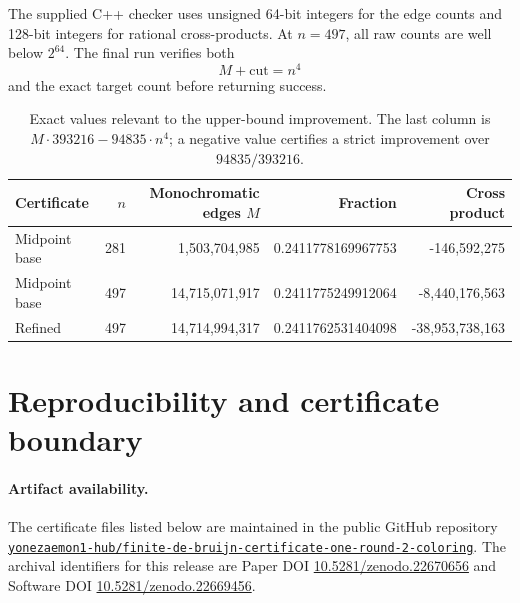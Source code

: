 \documentclass[11pt]{article}
\newcommand{\1}{\mathbf{1}}
\begin{document}
The supplied C++ checker uses unsigned 64-bit integers for the edge counts and
128-bit integers for rational cross-products.  At $n = 497$, all raw counts are
well below $2^{64}$.  The final run verifies both
\[
  M+\mathrm{cut}=n^4
\]
and the exact target count before returning success.

\begin{table}[t]
\centering
\caption{Exact values relevant to the upper-bound improvement.  The last
column is $M\cdot393216-94835\cdot n^4$; a negative value certifies a strict
improvement over $94835/393216$.}
\begin{tabular}{lrrrr}
\toprule
Certificate & $n$ & Monochromatic edges $M$ & Fraction & Cross product \\
\midrule
Midpoint base & 281 & 1,503,704,985 & 0.2411778169967753 & -146,592,275 \\
Midpoint base & 497 & 14,715,071,917 & 0.2411775249912064 & -8,440,176,563 \\
Refined & 497 & 14,714,994,317 & 0.2411762531404098 & -38,953,738,163 \\
\bottomrule
\end{tabular}
\end{table}

\section{Reproducibility and certificate boundary}

\paragraph{Artifact availability.}
The certificate files listed below are maintained in the public GitHub
repository
\href{https://github.com/yonezaemon1-hub/finite-de-bruijn-certificate-one-round-2-coloring}{\texttt{yonezaemon1-hub/finite-de-bruijn-certificate-one-round-2-coloring}}.
The archival identifiers for this release are Paper DOI
\href{https://doi.org/10.5281/zenodo.22670656}{10.5281/zenodo.22670656}
and Software DOI
\href{https://doi.org/10.5281/zenodo.22669456}{10.5281/zenodo.22669456}.
\end{document}
